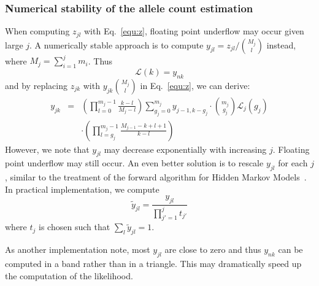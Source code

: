 \documentclass{bioinfo}
\begin{document}
\begin{methods}
\subsubsection{Numerical stability of the allele count estimation}
When computing $z_{jl}$ with Eq.~\eqref{equ:z}, floating point underflow may
occur given large $j$. A numerically stable approach is to compute
$y_{jl}=z_{jl}/\binom{M_j}{l}$ instead, where $M_j=\sum_{i=1}^j m_i$. Thus
\begin{equation}\label{equ:klky}
\mathcal{L}(k)=y_{nk}
\end{equation}
and by replacing $z_{jk}$ with $y_{jk}\binom{M_j}{l}$ in Eq.~\eqref{equ:z}, we can derive:
\begin{eqnarray}\label{equ:y}
y_{jk}&=&\left(\prod_{l=0}^{m_j-1}\frac{k-l}{M_{j}-l}\right)\sum_{g_j=0}^{m_j}y_{j-1,k-g_j}\cdot\binom{m_j}{g_j}\mathcal{L}_j(g_j)\\\nonumber
	&&\cdot\left(\prod_{l=g_j}^{m_j-1}\frac{M_{j-1}-k+l+1}{k-l}\right)
\end{eqnarray}
However, we note that $y_{jl}$ may decrease exponentially with increasing $j$.
Floating point underflow may still occur. An even better solution is to rescale
$y_{jl}$ for each $j$, similar to the treatment of the forward algorithm for
Hidden Markov Models~\citep{Durbin:1998uq}. In practical implementation, we
compute
\begin{equation}\label{eq:rescale}
\tilde{y}_{jl}=\frac{y_{jl}}{\prod_{j'=1}^jt_{j'}}
\end{equation}
where $t_{j}$ is chosen such that $\sum_{l}\tilde{y}_{jl}=1$.

As another implementation note, most $y_{jl}$ are close to zero and thus
$y_{nk}$ can be computed in a band rather than in a triangle. This may
dramatically speed up the computation of the likelihood.


\end{methods}
\end{document}
